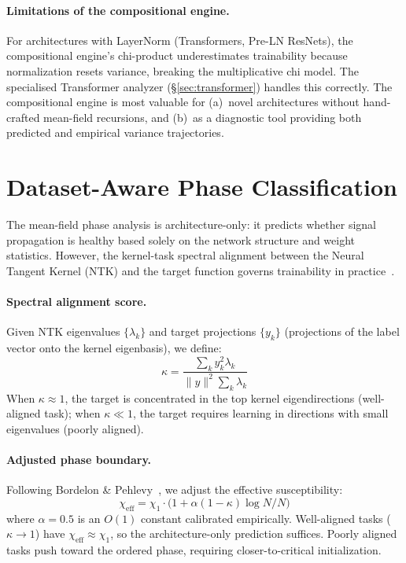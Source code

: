 \documentclass[10pt]{article}
\begin{document}
\paragraph{Limitations of the compositional engine.}
For architectures with LayerNorm (Transformers, Pre-LN ResNets), the compositional engine's chi-product underestimates trainability because normalization resets variance, breaking the multiplicative chi model.
The specialised Transformer analyzer (\S\ref{sec:transformer}) handles this correctly.
The compositional engine is most valuable for (a)~novel architectures without hand-crafted mean-field recursions, and (b)~as a diagnostic tool providing both predicted and empirical variance trajectories.

\section{Dataset-Aware Phase Classification}
\label{sec:data-aware}

The mean-field phase analysis is architecture-only: it predicts whether signal propagation is healthy based solely on the network structure and weight statistics.
However, the kernel-task spectral alignment between the Neural Tangent Kernel (NTK) and the target function governs trainability in practice~\cite{bordelon2020spectrum}.

\paragraph{Spectral alignment score.}
Given NTK eigenvalues $\{\lambda_k\}$ and target projections $\{y_k\}$ (projections of the label vector onto the kernel eigenbasis), we define:
\begin{equation}
    \kappa = \frac{\sum_k y_k^2 \lambda_k}{\|y\|^2 \sum_k \lambda_k}
    \label{eq:alignment}
\end{equation}
When $\kappa \approx 1$, the target is concentrated in the top kernel eigendirections (well-aligned task); when $\kappa \ll 1$, the target requires learning in directions with small eigenvalues (poorly aligned).

\paragraph{Adjusted phase boundary.}
Following Bordelon \& Pehlevy~\cite{bordelon2020spectrum}, we adjust the effective susceptibility:
\begin{equation}
    \chi_{\mathrm{eff}} = \chi_1 \cdot \bigl(1 + \alpha(1 - \kappa)\log N / N\bigr)
    \label{eq:chi-eff}
\end{equation}
where $\alpha = 0.5$ is an $O(1)$ constant calibrated empirically.
Well-aligned tasks ($\kappa \to 1$) have $\chi_{\mathrm{eff}} \approx \chi_1$, so the architecture-only prediction suffices.
Poorly aligned tasks push toward the ordered phase, requiring closer-to-critical initialization.
\end{document}
